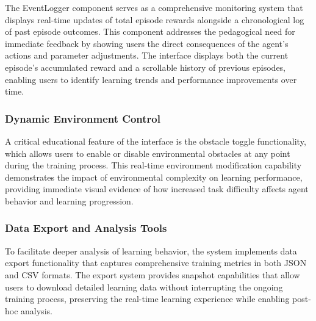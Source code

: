 The EventLogger component serves as a comprehensive monitoring system that displays real-time updates of total episode rewards alongside a chronological log of past episode outcomes. This component addresses the pedagogical need for immediate feedback by showing users the direct consequences of the agent's actions and parameter adjustments. The interface displays both the current episode's accumulated reward and a scrollable history of previous episodes, enabling users to identify learning trends and performance improvements over time.

\subsubsection{Dynamic Environment Control}
A critical educational feature of the interface is the obstacle toggle functionality, which allows users to enable or disable environmental obstacles at any point during the training process. This real-time environment modification capability demonstrates the impact of environmental complexity on learning performance, providing immediate visual evidence of how increased task difficulty affects agent behavior and learning progression.

\subsubsection{Data Export and Analysis Tools}
To facilitate deeper analysis of learning behavior, the system implements data export functionality that captures comprehensive training metrics in both JSON and CSV formats. The export system provides snapshot capabilities that allow users to download detailed learning data without interrupting the ongoing training process, preserving the real-time learning experience while enabling post-hoc analysis.